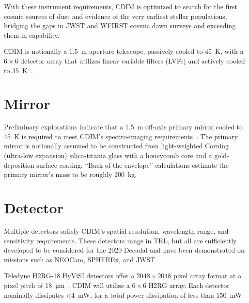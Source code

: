 \documentclass{ws-jai}
\begin{document}
With these instrument requirements, CDIM is optimized to search for the first cosmic sources of dust and evidence of the very earliest stellar populations, bridging the gaps in JWST and WFIRST cosmic dawn surveys and exceeding them in capability.

CDIM is notionally a \SI{1.5}{\meter} aperture telescope, passively cooled to \SI{45}{\kelvin}, with a $6\times6$ detector array that utilizes linear variable filters (LVFs) and actively cooled to \SI{35}{\kelvin}~\cite{cooray2016cdim2page}.

\section{Mirror}
\label{sec:mirror}
Preliminary explorations indicate that a \SI{1.5}{\meter} off-axis primary mirror cooled to \SI{45}{\kelvin} is required to meet CDIM's spectro-imaging  requirements~\cite{cooray2016cdim2page}.
The primary mirror is notionally assumed to be constructed from light-weighted Corning (ultra-low expansion) silica-titania glass with a honeycomb core and a gold-deposition surface coating.
``Back-of-the-envelope'' calculations estimate the primary mirror's mass to be roughly \SI{200}{\kilo\gram}.

\section{Detector}
\label{sec:detector}
Multiple detectors satisfy CDIM's spatial resolution, wavelength range, and sensitivity requirements.
These detectors range in TRL, but all are sufficiently developed to be considered for the 2020 Decadal and have been demonstrated on missions such as NEOCam, SPHEREx, and JWST\@.

Teledyne H2RG-18 HyViSI detectors offer a $2048\times2048$ pixel array format at a pixel pitch of \SI{18}{\micro\meter}~\cite{teledyneH2RG}.
CDIM will utilize a $6\times6$ H2RG array.
Each detector nominally dissipates \SI{<4}{\milli\watt}, for a total power dissipation of less than \SI{150}{\milli\watt}.
\end{document}
